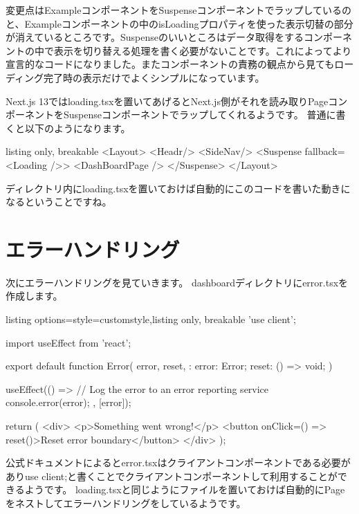 変更点はExampleコンポーネントをSuspenseコンポーネントでラップしているのと、Exampleコンポーネントの中のisLoadingプロパティを使った表示切替の部分が消えているところです。Suspenseのいいところはデータ取得をするコンポーネントの中で表示を切り替える処理を書く必要がないことです。これによってより宣言的なコードになりました。またコンポーネントの責務の観点から見てもローディング完了時の表示だけでよくシンプルになっています。

Next.js 13ではloading.tsxを置いてあげるとNext.js側がそれを読み取りPageコンポーネントをSuspenseコンポーネントでラップしてくれるようです。
普通に書くと以下のようになります。



\begin{tcblisting}{listing only, breakable}
  <Layout>
  <Headr/>
  <SideNav/>
  <Suspense fallback={<Loading />}>
  <DashBoardPage />
  </Suspense>
  </Layout>
\end{tcblisting}


ディレクトリ内にloading.tsxを置いておけば自動的にこのコードを書いた動きになるということですね。


\section{エラーハンドリング}

次にエラーハンドリングを見ていきます。
dashboardディレクトリにerror.tsxを作成します。


\begin{tcblisting}{listing options={style=customstyle},listing only, breakable}
  'use client';

  import { useEffect } from 'react';

  export default function Error({
      error,
      reset,
    }: {
  error: Error;
  reset: () => void;
  }) {
  useEffect(() => {
  // Log the error to an error reporting service
  console.error(error);
  }, [error]);

  return (
  <div>
  <p>Something went wrong!</p>
  <button onClick={() => reset()}>Reset error boundary</button>
  </div>
  );
  }
\end{tcblisting}



公式ドキュメントによるとerror.tsxはクライアントコンポーネントである必要がありuse client;と書くことでクライアントコンポーネントして利用することができるようです。
loading.tsxと同じようにファイルを置いておけば自動的にPageをネストしてエラーハンドリングをしているようです。

